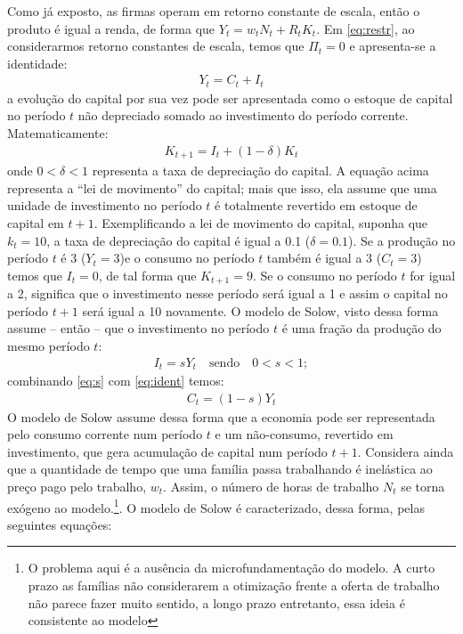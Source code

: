 \documentclass[11pt,a4paper]{article}
\begin{document}
Como já exposto, as firmas operam em retorno constante de escala, então o produto é igual a renda, de forma que $Y_t = w_t N_t + R_t K_t$. Em \ref{eq:restr}, ao considerarmos retorno constantes de escala, temos que $\Pi_t = 0$ e apresenta-se a identidade:
\begin{align} \label{eq:ident}
Y_t = C_t + I_t
\end{align}
\noindent
a evolução do capital por sua vez pode ser apresentada como o estoque de capital no período $t$ não depreciado somado ao investimento do período corrente. Matematicamente:
\begin{align}
K_{t+1} = I_t + (1 - \delta)K_t
\end{align}
\noindent
onde $0<\delta<1$ representa a taxa de depreciação do capital. A equação acima representa a ``lei de movimento'' do capital; mais que isso, ela assume que uma unidade de investimento no período $t$ é totalmente revertido em estoque de capital em $t+1$. Exemplificando a lei de movimento do capital, suponha que $k_t = 10$, a taxa de depreciação do capital é igual a 0.1 ($\delta = 0.1$). Se a produção no período $t$ é 3 ($Y_t = 3$)e o consumo no período $t$ também é igual a 3 ($C_t = 3$) temos que $I_t = 0$, de tal forma que $K_{t+1} = 9$. Se o consumo no período $t$ for igual a 2, significa que o investimento nesse período será igual a 1 e assim o capital no período $t+1$ será igual a 10 novamente. O modelo de Solow, visto dessa forma assume -- então -- que o investimento no período $t$ é uma fração da produção do mesmo período $t$:
\begin{align} \label{eq:s}
I_t = s Y_t \quad \text{sendo} \quad 0 < s < 1;
\end{align} 
\noindent
combinando \ref{eq:s} com \ref{eq:ident} temos:
\begin{align}
C_t = (1-s)Y_t
\end{align}
O modelo de Solow assume dessa forma que a economia pode ser representada pelo consumo corrente num período $t$ e um não-consumo, revertido em investimento, que gera acumulação de capital num período $t+1$. Considera ainda que a quantidade de tempo que uma família passa trabalhando é inelástica ao preço pago pelo trabalho, $w_t$. Assim, o número de horas de trabalho $N_t$ se torna exógeno ao modelo.\footnote{O problema aqui é a ausência da microfundamentação do modelo. A curto prazo as famílias não considerarem a otimização frente a oferta de trabalho não parece fazer muito sentido, a longo prazo entretanto, essa ideia é consistente ao modelo}. O modelo de Solow é caracterizado, dessa forma, pelas seguintes equações:
\end{document}
